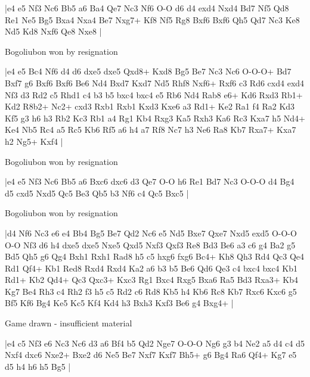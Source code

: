 \makegametitle
|e4 e5 Nf3 Nc6 Bb5 a6 Ba4 Qe7 Nc3 Nf6 O-O d6 d4 exd4 Nxd4 Bd7 Nf5 Qd8 Re1 Ne5 Bg5 Bxa4 Nxa4 Be7 Nxg7+ Kf8 Nf5 Rg8 Bxf6 Bxf6 Qh5 Qd7 Nc3 Ke8 Nd5 Kd8 Nxf6 Qe8 Nxe8  |

\showboard

Bogoliubon won by resignation

\makegametitle
|e4 e5 Bc4 Nf6 d4 d6 dxe5 dxe5 Qxd8+ Kxd8 Bg5 Be7 Nc3 Nc6 O-O-O+ Bd7 Bxf7 g6 Bxf6 Bxf6 Be6 Nd4 Bxd7 Kxd7 Nd5 Rhf8 Nxf6+ Rxf6 c3 Rd6 cxd4 exd4 Nf3 d3 Rd2 c5 Rhd1 c4 b3 b5 bxc4 bxc4 e5 Rb6 Nd4 Rab8 e6+ Kd6 Rxd3 Rb1+ Kd2 R8b2+ Nc2+ cxd3 Rxb1 Rxb1 Kxd3 Kxe6 a3 Rd1+ Ke2 Ra1 f4 Ra2 Kd3 Kf5 g3 h6 h3 Rb2 Kc3 Rb1 a4 Rg1 Kb4 Rxg3 Ka5 Rxh3 Ka6 Rc3 Kxa7 h5 Nd4+ Ke4 Nb5 Rc4 a5 Rc5 Kb6 Rf5 a6 h4 a7 Rf8 Nc7 h3 Ne6 Ra8 Kb7 Rxa7+ Kxa7 h2 Ng5+ Kxf4  |

\showboard

Bogoliubon won by resignation

\makegametitle
|e4 e5 Nf3 Nc6 Bb5 a6 Bxc6 dxc6 d3 Qe7 O-O h6 Re1 Bd7 Nc3 O-O-O d4 Bg4 d5 cxd5 Nxd5 Qc5 Be3 Qb5 b3 Nf6 c4 Qc5 Bxc5  |

\showboard

Bogoliubon won by resignation

\makegametitle
|d4 Nf6 Nc3 e6 e4 Bb4 Bg5 Be7 Qd2 Nc6 e5 Nd5 Bxe7 Qxe7 Nxd5 exd5 O-O-O O-O Nf3 d6 h4 dxe5 dxe5 Nxe5 Qxd5 Nxf3 Qxf3 Re8 Bd3 Be6 a3 c6 g4 Ba2 g5 Bd5 Qh5 g6 Qg4 Bxh1 Rxh1 Rad8 h5 c5 hxg6 fxg6 Bc4+ Kh8 Qh3 Rd4 Qc3 Qe4 Rd1 Qf4+ Kb1 Red8 Rxd4 Rxd4 Ka2 a6 b3 b5 Be6 Qd6 Qe3 c4 bxc4 bxc4 Kb1 Rd1+ Kb2 Qd4+ Qc3 Qxc3+ Kxc3 Rg1 Bxc4 Rxg5 Bxa6 Ra5 Bd3 Rxa3+ Kb4 Kg7 Be4 Rh3 c4 Rh2 f3 h5 c5 Rd2 c6 Rd8 Kb5 h4 Kb6 Rc8 Kb7 Rxc6 Kxc6 g5 Bf5 Kf6 Bg4 Ke5 Kc5 Kf4 Kd4 h3 Bxh3 Kxf3 Be6 g4 Bxg4+  |

\showboard

Game drawn - insufficient material

\makegametitle
|e4 c5 Nf3 e6 Nc3 Nc6 d3 a6 Bf4 b5 Qd2 Nge7 O-O-O Ng6 g3 b4 Ne2 a5 d4 c4 d5 Nxf4 dxc6 Nxe2+ Bxe2 d6 Ne5 Be7 Nxf7 Kxf7 Bh5+ g6 Bg4 Ra6 Qf4+ Kg7 e5 d5 h4 h6 h5 Bg5  |

\showboard

